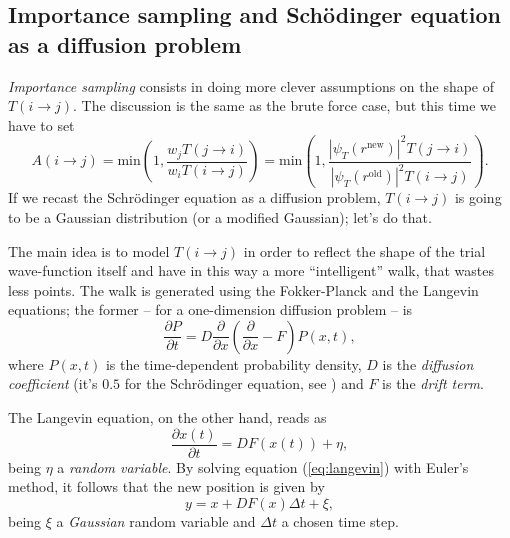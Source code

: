\documentclass[a4paper,twoside,11pt]{book}
\begin{document}
\subsection{Importance sampling and Schödinger equation as a diffusion problem}
\label{sec:importance}

\emph{Importance sampling} consists in doing more clever assumptions on the shape of $T(i \rightarrow j)$. The discussion is the same as the brute force case, but this time we have to set
\begin{equation}
	A(i\rightarrow j) 
	= \text{min} \left(1, \frac{w_jT(j \rightarrow i)}{w_iT(i \rightarrow j)} \right)
	= \text{min} \left(1, \frac{|\psi_T(r^{\text{new}})|^2T(j \rightarrow i)}{|\psi_T(r^{\text{old}})|^2T(i \rightarrow j)} \right).
	\label{eq:acceptance_imp}
\end{equation}
If we recast the Schr\"{o}dinger equation as a diffusion problem, $T(i \rightarrow j)$ is going to be a Gaussian distribution (or a modified Gaussian); let's do that.

The main idea is to model $T(i \rightarrow j)$ in order to reflect the shape of the trial wave-function itself and have in this way a more ``intelligent'' walk, that wastes less points. The walk is generated using the Fokker-Planck and the Langevin equations; the former -- for a one-dimension diffusion problem -- is
\begin{equation}
	\frac{\partial P}{\partial t} = D \dfrac{\partial}{\partial x} \left( \dfrac{\partial}{\partial x} - F \right)P(x,t),
\end{equation}
where
$P(x,t)$ is the time-dependent probability density, $D$ is the \emph{diffusion coefficient} (it's $0.5$ for the Schr\"{o}dinger equation, see \cite{Hoegberget2013}) and $F$ is the \emph{drift term}.

The Langevin equation, on the other hand, reads as
\begin{equation}
	\frac{\partial x(t)}{\partial t} = DF(x(t)) + \eta,
	\label{eq:langevin}
\end{equation}
being $\eta$ a \emph{random variable}. By solving equation (\ref{eq:langevin}) with Euler's method, it follows that the new position is given by
\begin{equation}
	y = x + DF(x)\Delta t + \xi,
\end{equation}
being $\xi$ a \emph{Gaussian} random variable and $\Delta t$ a chosen time step.
\end{document}
